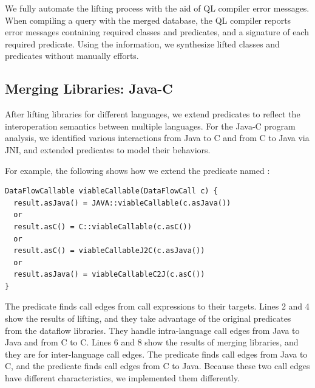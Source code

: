 We fully automate the lifting process with the aid of QL compiler error
messages. When compiling a query with the merged database, the QL compiler
reports error messages containing required classes and predicates, and a
signature of each required predicate. Using the information, we synthesize
lifted classes and predicates without manually efforts.


\subsection{Merging Libraries: Java-C}\label{sec:merging}
After lifting libraries for different languages, we extend predicates to
reflect the interoperation semantics between multiple languages.  
For the Java-C program analysis, we identified various interactions from Java
to C and from C to Java via JNI, and extended predicates to model their
behaviors.


For example, the following shows how we extend the predicate
named :
\begin{lstlisting}[style=codeql,xleftmargin=2.5em]
DataFlowCallable viableCallable(DataFlowCall c) {
  result.asJava() = JAVA::viableCallable(c.asJava())
  or
  result.asC() = C::viableCallable(c.asC())
  or
  result.asC() = viableCallableJ2C(c.asJava())
  or
  result.asJava() = viableCallableC2J(c.asC())
}
\end{lstlisting}

\noindent
The predicate  finds call edges from call expressions to
their targets. 
Lines 2 and 4 show the results of lifting, and they take advantage of the
original predicates from the dataflow libraries.  
They handle intra-language call edges from Java to Java and from C to C.
Lines 6 and 8 show the results of merging libraries, and they are
for inter-language call edges.  The predicate  finds call edges
from Java to C, and the predicate  finds call edges from
C to Java. Because these two call edges have different characteristics, we
implemented them differently.

